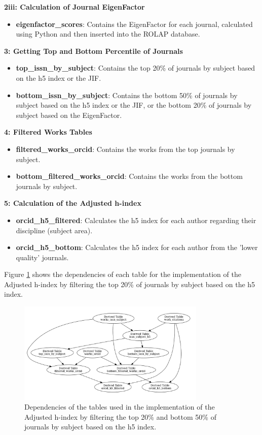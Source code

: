 \noindent\textbf{2iii: Calculation of Journal EigenFactor}
\begin{itemize}
      \item \textbf{eigenfactor\_scores}: Contains the EigenFactor for each journal, calculated using Python and then inserted into the ROLAP database.
\end{itemize}

\noindent\textbf{3: Getting Top and Bottom Percentile of Journals}
\begin{itemize}
      \item \textbf{top\_issn\_by\_subject}: Contains the top 20\% of journals by subject based on the h5 index or the JIF.
      \item \textbf{bottom\_issn\_by\_subject}: Contains the bottom 50\% of journals by subject based on the h5 index or the JIF, or 
            the bottom 20\% of journals by subject based on the EigenFactor.
\end{itemize}

\noindent\textbf{4: Filtered Works Tables}
\begin{itemize}
      \item \textbf{filtered\_works\_orcid}: Contains the works from the top journals by subject.
      \item \textbf{bottom\_filtered\_works\_orcid}: Contains the works from the bottom journals by subject.
\end{itemize}

\noindent\textbf{5: Calculation of the Adjusted h-index}
\begin{itemize}
      \item \textbf{orcid\_h5\_filtered}: Calculates the h5 index for each author regarding their discipline (subject area).
      \item \textbf{orcid\_h5\_bottom}: Calculates the h5 index for each author from the 'lower quality' journals.
\end{itemize}

Figure \ref{fig:tables} shows the dependencies of each table for the
implementation of the Adjusted h-index by filtering the top 20\% of journals by
subject based on the h5 index.

\begin{figure}[H]
      \centering
      \includegraphics[width=0.8\textwidth]{../figs/h5.pdf}
      \caption{Dependencies of the tables used in the implementation of the Adjusted h-index by filtering the top 20\% and bottom 50\% of journals by subject based on the h5 index.}
      \label{fig:tables}
\end{figure}

